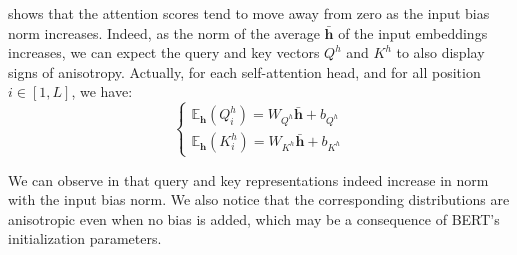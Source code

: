  shows that the attention scores tend to move away from zero as the input bias norm increases. Indeed, as the norm of the average $\bar{\mathbf{h}}$ of the input embeddings increases, we can expect the query and key vectors $Q^h$ and $K^h$ to also display signs of anisotropy. Actually, for each self-attention head, and for all position $i \in [1, L]$, we have:
\begin{equation}
    \begin{cases}
      \mathbb{E}_{\mathbf{h}}(Q^h_i) = W_{Q^h}\bar{\mathbf{h}} + b_{Q^h}\\
      \mathbb{E}_{\mathbf{h}}(K^h_i) = W_{K^h}\bar{\mathbf{h}} + b_{K^h}
    \end{cases}
\end{equation}

We can observe in  that query and key representations indeed increase in norm with the input bias norm. We also notice that the corresponding distributions are anisotropic even when no bias is added, which may be a consequence of BERT's initialization parameters.

